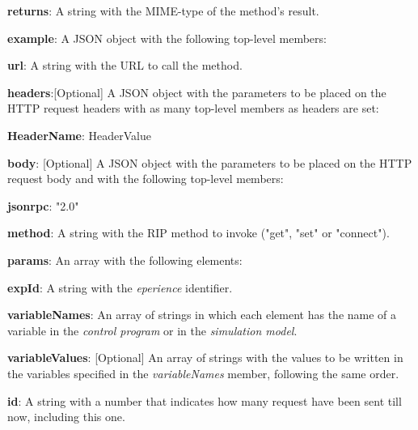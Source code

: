 \begin{myEnumerate}
\begin{myEnumerate}
\begin{myEnumerate}
\begin{myEnumerate}
            \end{myEnumerate}
            \item \textbf{returns}: A string with the MIME-type of the method's result.
            \item \textbf{example}: A JSON object with the following top-level members:
            \begin{myEnumerate}
                    \item \textbf{url}: A string with the URL to call the method.
                    \item \textbf{headers}:[Optional] A JSON object with the parameters to be placed on the HTTP request headers with as many top-level members as headers are set:
                    \begin{myEnumerate}
                        \item \textbf{HeaderName}: HeaderValue
                    \end{myEnumerate}
                    \item \textbf{body}: [Optional] A JSON object with the parameters to be placed on the HTTP request body and with the following top-level members:
                    \begin{myEnumerate}
                        \item \textbf{jsonrpc}: "2.0"
                        \item \textbf{method}: A string with the RIP method to invoke ("get", "set" or "connect"). %
                        \item \textbf{params}: An array with the following elements:
                        \begin{myEnumerate}
                            \item \textbf{expId}: A string with the \textit{eperience} identifier.
                            \item \textbf{variableNames}: An array of strings in which each element has the name of a variable in the \textit{control program} or in the \textit{simulation model}.
                            \item \textbf{variableValues}: [Optional] An array of strings with the values to be written in the variables specified in the \textit{variableNames} member, following the same order.
                        \end{myEnumerate}
                        \item \textbf{id}: A string with a number that indicates how many request have been sent till now, including this one.

\end{myEnumerate}
\end{myEnumerate}
\end{myEnumerate}
\end{myEnumerate}
\end{myEnumerate}
